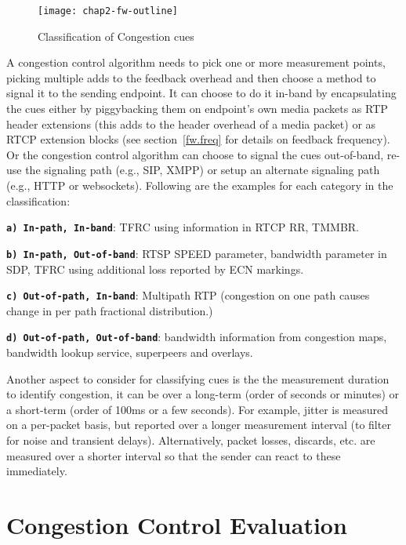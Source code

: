 \begin{figure}[!h]
\texttt{[image: chap2-fw-outline]}
\caption{Classification of Congestion cues}
\label{fig:4:fw}
\end{figure}

A congestion control algorithm needs to pick one or more measurement points,
picking multiple adds to the feedback overhead and then choose a method to
signal it to the sending endpoint. It can choose to do it in-band by
encapsulating the cues either by piggybacking them on endpoint's own media
packets as RTP header extensions (this adds to the header overhead of a media
packet) or as RTCP extension blocks (see section~\ref{fw.freq} for details on
feedback frequency). Or the congestion control algorithm can choose to signal
the cues out-of-band, re-use the signaling path (e.g., SIP, XMPP) or setup an
alternate signaling path (e.g., HTTP or websockets). Following are the
examples for each category in the classification:

\textbf{\texttt{a) In-path, In-band}}: TFRC using information in RTCP RR,
TMMBR.

\textbf{\texttt{b) In-path, Out-of-band}}: RTSP SPEED parameter, bandwidth
parameter in SDP, TFRC using additional loss reported by ECN markings.

\textbf{\texttt{c) Out-of-path, In-band}}: Multipath RTP (congestion on one
path causes change in per path fractional distribution.)

\textbf{\texttt{d) Out-of-path, Out-of-band}}: bandwidth information from
congestion maps, bandwidth lookup service, superpeers and overlays.


Another aspect to consider for classifying cues is the the measurement
duration to identify congestion, it can be over a long-term (order of seconds
or minutes) or a short-term (order of 100ms or a few seconds). For example,
jitter is measured on a per-packet basis, but reported over a longer
measurement interval (to filter for noise and transient delays).
Alternatively, packet losses, discards, etc. are measured over a shorter
interval so that the sender can react to these immediately.

\section{Congestion Control Evaluation}
\label{fw.cc.eval}


